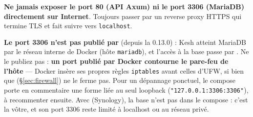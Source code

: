 \documentclass[a4paper,11pt,oneside]{article}
\begin{document}
\begin{keshwarning}
\textbf{Ne jamais exposer le port 80 (API Axum) ni le port 3306 (MariaDB) directement sur Internet}. Toujours passer par un reverse proxy HTTPS qui termine TLS et fait suivre vers \texttt{localhost}.

\textbf{Le port 3306 n'est pas publié par } (depuis la 0.13.0) : Kesh atteint MariaDB par le réseau interne de Docker (hôte \texttt{mariadb}), et l'accès à la base passe par . Ne le publiez pas : \textbf{un port publié par Docker contourne le pare-feu de l'hôte} --- Docker insère ses propres règles \texttt{iptables} avant celles d'UFW, si bien que  (\S\ref{sec:firewall}) ne le ferme pas. Pour un dépannage ponctuel, le compose porte en commentaire une forme liée au seul loopback (\texttt{"127.0.0.1:3306:3306"}), à recommenter ensuite. Avec  (Synology), la base n'est pas dans le compose : c'est la vôtre, et son port 3306 reste limité à localhost ou au réseau privé.
\end{keshwarning}
\end{document}
